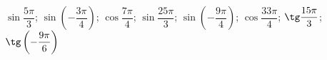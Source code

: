 \begin{ex}[type=calculate]
	\begin{condition}
		\( \sin\dfrac{5\pi}{3} \); \( \sin\left( -\dfrac{3\pi}{4} \right) \); \( \cos\dfrac{7\pi}{4} \); \( \sin\dfrac{25\pi}{3} \); \( \sin\left( -\dfrac{9\pi}{4}  \right)\); \( \cos\dfrac{33\pi}{4} \);  \( \tg\dfrac{15\pi}{3} \); \( \tg\left( -\dfrac{9\pi}{6}  \right)\)
	\end{condition}
\end{ex}